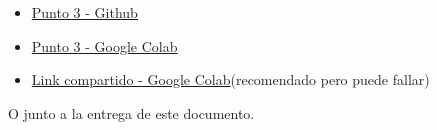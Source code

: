     \begin{itemize}
        \item \href{https://github.com/lldddv2/Medios_continuos_Tarea1/blob/main/punto_3.ipynb}{Punto 3 - Github}
        \item \href{https://colab.research.google.com/github/lldddv2/Medios_continuos_Tarea1/blob/main/punto_3.ipynb}{Punto 3 - Google Colab}
        \item \href{https://colab.research.google.com/drive/18qf2Yvjjh4FGOMOCSaqHRxMDfBgcxVjt?usp=sharing}{Link compartido - Google Colab}(recomendado pero puede fallar)
    \end{itemize}

    O junto  a la entrega de este documento.